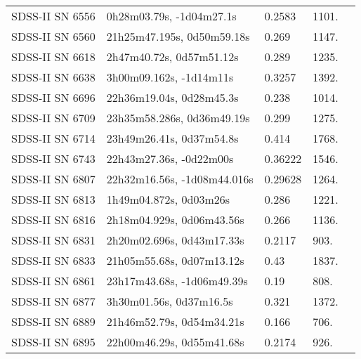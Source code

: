 \begin{longtable}{lllll}
  SDSS-II SN 6556 &       0h28m03.79s, -1d04m27.1s &   0.2583 &          1101. &    \citet{2016SDSSD.C...0000:} \\
  SDSS-II SN 6560 &     21h25m47.195s, 0d50m59.18s &    0.269 &          1147. &    \citet{2011ApJ...738..162S} \\
  SDSS-II SN 6618 &       2h47m40.72s, 0d57m51.12s &    0.289 &          1235. &    \citet{2011ApJ...738..162S} \\
  SDSS-II SN 6638 &        3h00m09.162s, -1d14m11s &   0.3257 &          1392. &    \citet{2011ApJ...738..162S} \\
  SDSS-II SN 6696 &       22h36m19.04s, 0d28m45.3s &    0.238 &          1014. &    \citet{2008AJ....135..348S} \\
  SDSS-II SN 6709 &     23h35m58.286s, 0d36m49.19s &    0.299 &          1275. &    \citet{2011ApJ...738..162S} \\
  SDSS-II SN 6714 &       23h49m26.41s, 0d37m54.8s &    0.414 &          1768. &    \citet{2010ApJ...713.1026D} \\
  SDSS-II SN 6743 &        22h43m27.36s, -0d22m00s &  0.36222 &          1546. &    \citet{2016SDSSD.C...0000:} \\
  SDSS-II SN 6807 &    22h32m16.56s, -1d08m44.016s &  0.29628 &          1264. &    \citet{2016SDSSD.C...0000:} \\
  SDSS-II SN 6813 &         1h49m04.872s, 0d03m26s &    0.286 &          1221. &    \citet{2011ApJ...738..162S} \\
  SDSS-II SN 6816 &      2h18m04.929s, 0d06m43.56s &    0.266 &          1136. &    \citet{2011ApJ...738..162S} \\
  SDSS-II SN 6831 &      2h20m02.696s, 0d43m17.33s &   0.2117 &           903. &    \citet{2011ApJ...738..162S} \\
  SDSS-II SN 6833 &      21h05m55.68s, 0d07m13.12s &     0.43 &          1837. &    \citet{2011ApJ...738..162S} \\
  SDSS-II SN 6861 &     23h17m43.68s, -1d06m49.39s &     0.19 &           808. &    \citet{2011ApJ...738..162S} \\
  SDSS-II SN 6877 &        3h30m01.56s, 0d37m16.5s &    0.321 &          1372. &    \citet{2010ApJ...713.1026D} \\
  SDSS-II SN 6889 &      21h46m52.79s, 0d54m34.21s &    0.166 &           706. &    \citet{2011ApJ...738..162S} \\
  SDSS-II SN 6895 &      22h00m46.29s, 0d55m41.68s &   0.2174 &           926. &    \citet{2011ApJ...738..162S} \\

\end{longtable}
